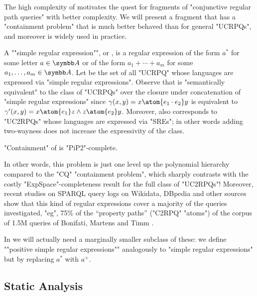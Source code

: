 The high complexity of  motivates
the quest for fragments of "conjunctive regular path queries" with better complexity.
We will present a fragment {\UCRPQSRE} that
has a "containment problem" that is much better behaved than for general "UCRPQs",
and moreover is widely used in practice.

\AP A ""simple regular expression"", or , is a regular expression of the form $a^*$ for some letter $a \in \A$ or of the form $a_1 + \dotsb + a_m$ for some $a_1, \dotsc, a_m \in \A$. 
\AP Let \intro*{\UCRPQSRE} be the set of all "UCRPQ" whose languages are expressed via "simple regular expressions". Observe that {\UCRPQSRE} is "semantically equivalent" to the class of "UCRPQs" over the closure under concatenation of "simple regular expressions"
since $\gamma(x,y) = x \atom{e_1 \cdot e_2} y$ is equivalent to $\gamma'(x,y) = x \atom{e_1} z \land  z \atom{e_2} y$.
Moreover, \UCRPQSRE{} also corresponds to "UC2RPQs" whose languages are expressed via "SREs";
in other words adding two-wayness does not increase the expressivity of the class. 

\begin{proposition}
    "Containment" of {\UCRPQSRE} is "PiP2"-complete.
\end{proposition}

In other words, this problem is just one level up the polynomial hierarchy compared to the "CQ" "containment problem", which sharply contrasts with the costly "ExpSpace"-completeness result
for the full class of "UC2RPQs"!
Moreover, recent studies on SPARQL query logs on Wikidata, DBpedia and other sources show that this kind of regular expressions cover a majority of the queries investigated, "eg", 75\% of
the ``property paths'' ("C2RPQ" "atoms") of the corpus of 1.5M queries of Bonifati, Martens and Timm \cite[Table 15]{BonifatiMartensTimm2020SPARQL}.

In  we will actually need a marginally smaller subclass of these:
we define \AP""positive simple regular expressions"" analogously to
"simple regular expressions" but by replacing $a^*$ with $a^+$.

\subsection{Static Analysis}

